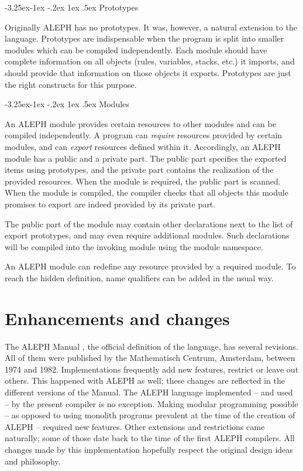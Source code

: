 \documentclass{article}
\makeatletter
\newcommand\A{\textsf{ALEPH}}
\renewcommand\subsection{%
\@startsection{subsection}{2}{\z@}%
   {-3.25ex\@plus -1ex \@minus -.2ex}%
   {1ex \@plus .5ex}%
   {\normalfont\normalsize\bfseries}}
\makeatother
\begin{document}
\subsection{Prototypes}

Originally \A{} has no prototypes. It was, however, a natural extension to
the language. Prototypes are indispensable when the program is split into
smaller modules which can be compiled independently. Each module should
have complete information on all objects (rules, variables, stacks, etc.) it
imports, and should provide that information on those objects it exports.
Prototypes are just the right constructs for this purpose.

\subsection{Modules}

An \A{} module provides certain resources to other modules and can be
compiled independently. A program can \emph{require} resources provided by
certain modules, and can \emph{export} resources defined within it.
Accordingly, an \A{} module has a public and a private part. The public part
specifies the exported items using prototypes, and the private part
contains the realization of the provided resources. When the module is
required, the public part is scanned. When the module is compiled, the
compiler checks that all objects this module promises to export are indeed
provided by its private part.

The public part of the module may contain other declarations next to the
list of export prototypes, and may even require additional modules. Such
declarations will be compiled into the invoking module using the module
namespace.

An \A{} module can redefine any resource provided by a required module. To
reach the hidden definition, name qualifiers can be added in the usual way.


\section{Enhancements and changes}

The \A{} Manual \cite{A-manual}, the official definition of the language,
has several revisions. All of them were published by the Mathematisch
Centrum, Amsterdam, between 1974 and 1982. Implementations frequently add
new features, restrict or leave out others. This happened with \A{} as well;
these changes are reflected in the different versions of the Manual. The \A{}
language implemented -- and used -- by the present compiler is no exception.
Making modular programming possible -- as opposed to using monolith programs
prevalent at the time of the creation of \A{} -- required new features.
Other extensions and restrictions came naturally; some of those date back to
the time of the first \A{} compilers. All changes made by this
implementation hopefully respect the original design ideas and philosophy.
\end{document}
